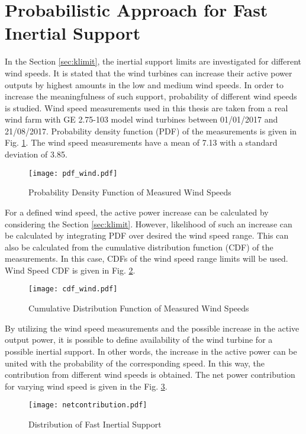 \section{Probabilistic Approach for Fast Inertial Support}
In the Section \ref{sec:klimit}, the inertial support limits are investigated for different wind speeds. It is stated that the wind turbines can increase their active power outputs by highest amounts in the low and medium wind speeds. In order to increase the meaningfulness of such support, probability of different wind speeds is studied. Wind speed measurements used in this thesis are taken from a real wind farm with GE 2.75-103 model wind turbines between 01/01/2017 and 21/08/2017. Probability density function (PDF) of the measurements is given in Fig. \ref{windpdf}. The wind speed measurements have a mean of 7.13 with a standard deviation of 3.85.\par
\begin{figure}[h!]
	\centering
	\texttt{[image: pdf\_wind.pdf]}
	\caption{Probability Density Function of Measured Wind Speeds}
	\label{windpdf}
\end{figure}
For a defined wind speed, the active power increase can be calculated by considering the Section \ref{sec:klimit}. However, likelihood of such an increase can be calculated by integrating PDF over desired the wind speed range. This can also be calculated from the cumulative distribution function (CDF) of the measurements. In this case, CDFs of the wind speed range limits will be used. Wind Speed CDF is given in Fig. \ref{windcdf}. \par
\begin{figure}[h!]
	\centering
	\texttt{[image: cdf\_wind.pdf]}
	\caption{Cumulative Distribution Function of Measured Wind Speeds}
	\label{windcdf}
\end{figure}
By utilizing the wind speed measurements and the possible increase in the active output power, it is possible to define availability of the wind turbine for a possible inertial support. In other words, the increase in the active power can be united with the probability of the corresponding speed. In this way, the contribution from different wind speeds is obtained. The net power contribution for varying wind speed is given in the Fig. \ref{net_contribution}.\par
\begin{figure}[h!]
	\centering
	\texttt{[image: netcontribution.pdf]}
	\caption{Distribution of Fast Inertial Support}
	\label{net_contribution}
\end{figure}
